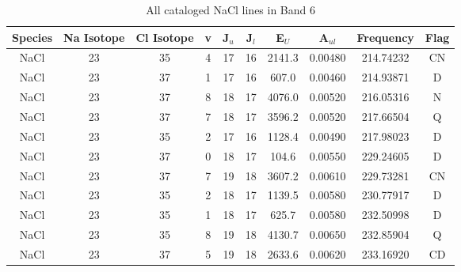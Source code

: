 \begin{table*}[htp]
\centering
\caption{All cataloged NaCl lines in Band 6}
\begin{tabular}{cccccccccc}
\label{tab:Na_detections_B6}
Species & Na Isotope & Cl Isotope & v & J$_u$ & J$_l$ & E$_U$ & A$_{ul}$ & Frequency & Flag \\
\hline
NaCl & 23 & 35 & 4 & 17 & 16 & 2141.3 & 0.00480 & 214.74232 & CN \\
NaCl & 23 & 37 & 1 & 17 & 16 & 607.0 & 0.00460 & 214.93871 & D \\
NaCl & 23 & 37 & 8 & 18 & 17 & 4076.0 & 0.00520 & 216.05316 & N \\
NaCl & 23 & 37 & 7 & 18 & 17 & 3596.2 & 0.00520 & 217.66504 & Q \\
NaCl & 23 & 35 & 2 & 17 & 16 & 1128.4 & 0.00490 & 217.98023 & D \\
NaCl & 23 & 37 & 0 & 18 & 17 & 104.6 & 0.00550 & 229.24605 & D \\
NaCl & 23 & 37 & 7 & 19 & 18 & 3607.2 & 0.00610 & 229.73281 & CN \\
NaCl & 23 & 35 & 2 & 18 & 17 & 1139.5 & 0.00580 & 230.77917 & D \\
NaCl & 23 & 35 & 1 & 18 & 17 & 625.7 & 0.00580 & 232.50998 & D \\
NaCl & 23 & 35 & 8 & 19 & 18 & 4130.7 & 0.00650 & 232.85904 & Q \\
NaCl & 23 & 37 & 5 & 19 & 18 & 2633.6 & 0.00620 & 233.16920 & CD \\
\hline
\end{tabular}

\par 
\end{table*}
